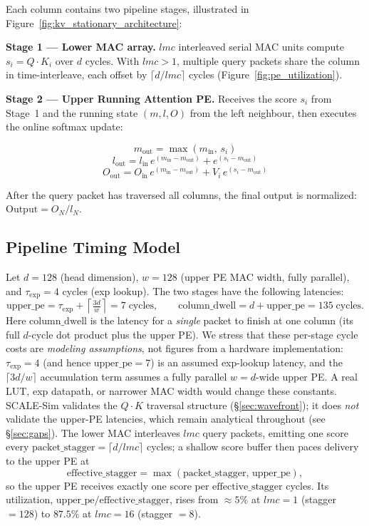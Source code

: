 \documentclass[11pt]{article}
\begin{document}
Each column contains two pipeline stages, illustrated in
Figure~\ref{fig:kv_stationary_architecture}:

\textbf{Stage 1 --- Lower MAC array.}
\(lmc\) interleaved serial MAC units compute
\(s_i = Q \cdot K_i\) over \(d\) cycles.
With \(lmc > 1\), multiple query packets share the column
in time-interleave, each offset by
\(\lceil d / lmc \rceil\) cycles (Figure~\ref{fig:pe_utilization}).

\textbf{Stage 2 --- Upper Running Attention PE.}
Receives the score \(s_i\) from Stage~1 and the running
state \((m, l, O)\) from the left neighbour, then executes
the online softmax update:

\[
m_{\text{out}} = \max(m_{\text{in}},\, s_i)
\]
\[
l_{\text{out}} = l_{\text{in}}\,e^{(m_{\text{in}} - m_{\text{out}})}
               + e^{(s_i - m_{\text{out}})}
\]
\[
O_{\text{out}} = O_{\text{in}}\,e^{(m_{\text{in}} - m_{\text{out}})}
               + V_i\,e^{(s_i - m_{\text{out}})}
\]

After the query packet has traversed all columns,
the final output is normalized:
\(\text{Output} = O_N / l_N\).

\subsection{Pipeline Timing Model}
\label{sec:pipeline}

Let \(d = 128\) (head dimension), \(w = 128\) (upper PE MAC width,
fully parallel), and \(\tau_{\exp} = 4\) cycles (exp lookup). The two
stages have the following latencies:
\[
\text{upper\_pe} = \tau_{\exp} + \left\lceil \tfrac{3d}{w} \right\rceil = 7
\;\text{cycles},
\qquad
\text{column\_dwell} = d + \text{upper\_pe} = 135 \;\text{cycles}.
\]
Here \(\text{column\_dwell}\) is the latency for a \emph{single} packet to
finish at one column (its full \(d\)-cycle dot product plus the upper PE).
We stress that these per-stage cycle costs are \emph{modeling assumptions}, not
figures from a hardware implementation: \(\tau_{\exp} = 4\) (and hence
\(\text{upper\_pe} = 7\)) is an assumed exp-lookup latency, and the
\(\lceil 3d/w \rceil\) accumulation term assumes a fully parallel \(w = d\)-wide
upper PE. A real LUT, exp datapath, or narrower MAC width would change these
constants. SCALE-Sim validates the \(Q\!\cdot\!K\) traversal structure
(\S\ref{sec:wavefront}); it does \emph{not} validate the upper-PE latencies,
which remain analytical throughout (see \S\ref{sec:gaps}).
The lower MAC interleaves \(lmc\) query packets, emitting one score every
\(\text{packet\_stagger} = \lceil d / lmc \rceil\) cycles; a shallow score
buffer then paces delivery to the upper PE at
\[
\text{effective\_stagger} = \max(\text{packet\_stagger},\,\text{upper\_pe}),
\]
so the upper PE receives exactly one score per \(\text{effective\_stagger}\)
cycles. Its utilization, \(\text{upper\_pe} / \text{effective\_stagger}\), rises
from \(\approx\!5\%\) at \(lmc = 1\) (stagger \(= 128\)) to \(87.5\%\) at
\(lmc = 16\) (stagger \(= 8\)).
\end{document}
